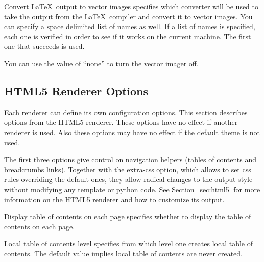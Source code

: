\begin{configuration}{Convert \LaTeX\ output to vector images}
specifies which converter will be used to take the output from the
\LaTeX\ compiler and convert it to vector images.  You can specify a space
delimited list of names as well.  If a list of names is specified,
each one is verified in order to see if it works on the current machine.
The first one that succeeds is used.

You can use the value of ``none'' to turn the vector imager off.

\end{configuration}

\subsection{HTML5 Renderer Options\label{sec:config-html5}}

Each renderer can define its own configuration options. This section
describes options from the HTML5 renderer. These options have no effect
if another renderer is used. Also these options may have no effect if
the default theme is not used.

The first three options give control on navigation helpers (tables of
contents and breadcrumbs links). Together with the extra-css option,
which allows to set css rules overriding the default ones, they allow
radical changes to the output style without modifying any template or
python code. See Section~\ref{sec:html5} for more information on the
HTML5 renderer and how to customize its output.

\begin{configuration}{Display table of contents on each page}
specifies whether to display the table of contents on each page.
\end{configuration}


\begin{configuration}{Local table of contents level}
specifies from which level one creates local table of contents. The
default value implies local table of contents are never created.
\end{configuration}


